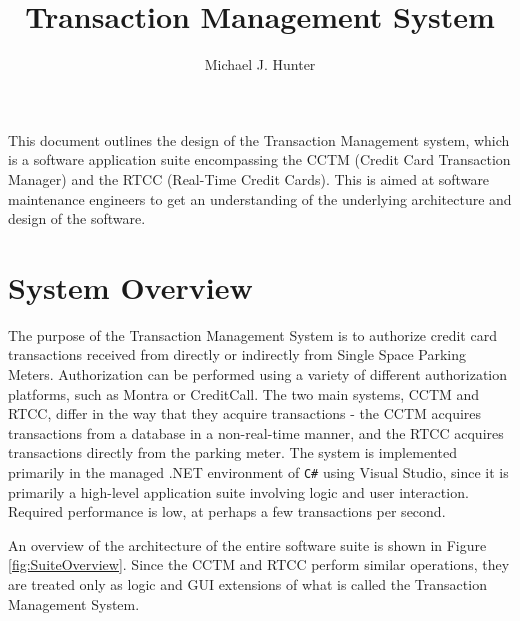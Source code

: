 \documentclass[a4paper,oneside,10pt]{report}
\newcommand{\cs}{\texttt{C\#}}
\begin{document}
\pagestyle{empty} %


\title{Transaction Management System}
\author{Michael J. Hunter}
\maketitle

\tableofcontents %
\cleardoublepage %

\pagestyle{plain} %

This document outlines the design of the Transaction Management system, which is a software application suite encompassing the CCTM (Credit Card Transaction Manager) and the RTCC (Real-Time Credit Cards). This is aimed at software maintenance engineers to get an understanding of the underlying architecture and design of the software.

\section{System Overview}

The purpose of the Transaction Management System is to authorize credit card transactions received from directly or indirectly from Single Space Parking Meters. Authorization can be performed using a variety of different authorization platforms, such as Montra or CreditCall. The two main systems, CCTM and RTCC, differ in the way that they acquire transactions - the CCTM acquires transactions from a database in a non-real-time manner, and the RTCC acquires transactions directly from the parking meter.
The system is implemented primarily in the managed .NET environment of \cs{} using Visual Studio, since it is primarily a high-level application suite involving logic and user interaction. Required performance is low, at perhaps a few transactions per second.

An overview of the architecture of the entire software suite is shown in Figure \ref{fig:SuiteOverview}. Since the CCTM and RTCC perform similar operations, they are treated only as logic and GUI extensions of what is called the Transaction Management System.
\end{document}

